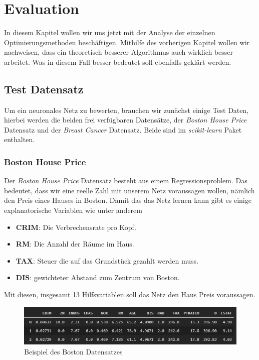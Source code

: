 \section{Evaluation}\label{Evaluation}

In diesem Kapitel wollen wir uns jetzt mit der Analyse der einzelnen 
Optimierungsmethoden beschäftigen. Mithilfe des vorherigen Kapitel wollen
wir nachweisen, dass ein theoretisch besserer Algorithmus auch wirklich besser 
arbeitet. Was in diesem Fall besser bedeutet soll ebenfalls geklärt werden.

\subsection{Test Datensatz} \label{Test Datensatz}

Um ein neuronales Netz zu bewerten, brauchen wir zunächst einige Test Daten,
hierbei werden die beiden frei verfügbaren Datensätze, der \textit{Boston House Price}
Datensatz und der \textit{Breast Cancer} Datensatz. Beide sind im \textit{scikit-learn}
Paket \cite{scikit-learn} enthalten. 

\subsubsection{Boston House Price} \label{Boston House Price}

Der \textit{Boston House Price} Datensatz besteht aus einem Regressionsproblem.
Das bedeutet, dass wir eine reelle Zahl mit unserem Netz voraussagen wollen, nämlich den
Preis eines Hauses in Boston. Damit das das  Netz lernen kann gibt es einige 
explanatorische Variablen wie unter anderem

\begin{itemize}
    \item \textbf{CRIM}: Die Verbrechensrate pro Kopf.
    \item \textbf{RM}: Die Anzahl der Räume im Haus.
    \item \textbf{TAX}: Steuer die auf das Grundstück gezahlt werden muss.
    \item \textbf{DIS}: gewichteter Abstand zum Zentrum von Boston. 
\end{itemize}

Mit diesen, insgesamt 13 Hilfsvariablen soll das Netz den Haus Preis voraussagen.

\begin{figure}[htbp] 
    \centering
       \includegraphics[width=1.0\textwidth]{abb/BostonBeispiel.PNG}
    \caption{Beispiel des Boston Datensatzes}
    \label{fig:Bild1}
\end{figure}


